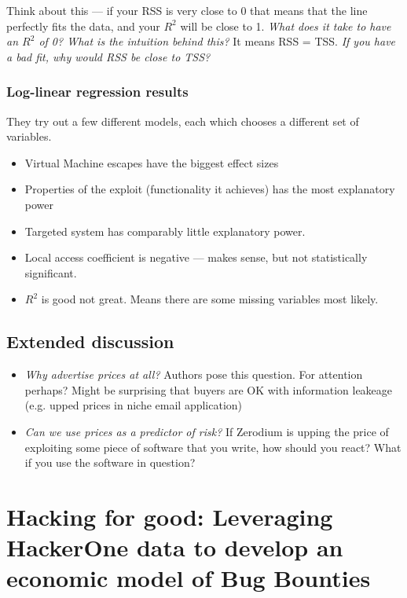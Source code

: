 \documentclass[11pt]{article}
\begin{document}
Think about this --- if your RSS is very close to 0 that means that the line perfectly fits the data, and your $R^2$ will be close to 1. {\it What does it take to have an $R^2$ of 0? What is the intuition behind this?} It means RSS = TSS. {\it If you have a bad fit, why would RSS be close to TSS?}


\subsubsection{Log-linear regression results}

They try out a few different models, each which chooses a different set of variables. 

\begin{itemize}
    \item Virtual Machine escapes have the biggest effect sizes 
    \item Properties of the exploit (functionality it achieves) has the most explanatory power
    \item Targeted system has comparably little explanatory power.
    \item Local access coefficient is negative --- makes sense, but not statistically significant.
    \item $R^2$ is good not great. Means there are some missing variables most likely. 
\end{itemize}

\subsection{Extended discussion}


\begin{itemize}
    \item {\it Why advertise prices at all?} Authors pose this question. For attention perhaps? Might be surprising that buyers are OK with information leakeage (e.g. upped prices in niche email application)
    \item {\it Can we use prices as a predictor of risk?} If Zerodium is upping the price of exploiting some piece of software that you write, how should you react? What if you use the software in question?
\end{itemize}

\section{Hacking for good: Leveraging HackerOne data to develop an economic model of Bug Bounties}
\end{document}
